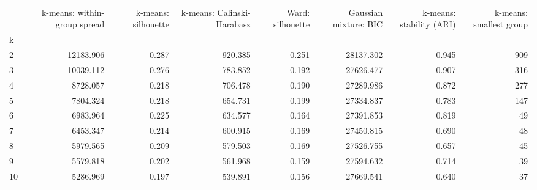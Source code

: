 \begin{tabular}{lrrrrrrr}
\toprule
 & k-means: within-group spread & k-means: silhouette & k-means: Calinski-Harabasz & Ward: silhouette & Gaussian mixture: BIC & k-means: stability (ARI) & k-means: smallest group \\
k &  &  &  &  &  &  &  \\
\midrule
2 & 12183.906 & 0.287 & 920.385 & 0.251 & 28137.302 & 0.945 & 909 \\
3 & 10039.112 & 0.276 & 783.852 & 0.192 & 27626.477 & 0.907 & 316 \\
4 & 8728.057 & 0.218 & 706.478 & 0.190 & 27289.986 & 0.872 & 277 \\
5 & 7804.324 & 0.218 & 654.731 & 0.199 & 27334.837 & 0.783 & 147 \\
6 & 6983.964 & 0.225 & 634.577 & 0.164 & 27391.853 & 0.819 & 49 \\
7 & 6453.347 & 0.214 & 600.915 & 0.169 & 27450.815 & 0.690 & 48 \\
8 & 5979.565 & 0.209 & 579.503 & 0.169 & 27526.755 & 0.657 & 45 \\
9 & 5579.818 & 0.202 & 561.968 & 0.159 & 27594.632 & 0.714 & 39 \\
10 & 5286.969 & 0.197 & 539.891 & 0.156 & 27669.541 & 0.640 & 37 \\
\bottomrule
\end{tabular}

